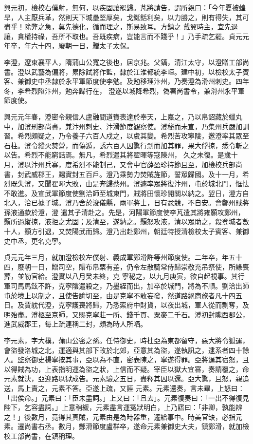 \begin{pinyinscope}
 興元初，檢校右僕射，無何，以疾固讓罷歸。芃將請告，謂所親曰：「今年夏被蝗旱，人主厭兵革，然則天下城壘堅厚矣，戈鋋銛利矣，以力勝之，則有得失，其可盡乎！除弊之急，莫先德化，循而理之，斯易致耳。方鎮之
 戴翼時主，宜先退讓，貪權持祿，吾所不取也。吾既疾病，豈能言而不踐乎！」乃手疏乞罷。貞元元年卒，年六十四，廢朝一日，贈太子太保。



 李澄，遼東襄平人，隋蒲山公寬之後也，居京兆。父鎬，清江太守，以澄贈工部尚書。澄以武藝為偏將，累除試將作監，隸於江淮都統李峘。建中初，以檢校太子賓客、兼御史中丞隸於永平軍節度使李勉。及勉移理汴州，乃奏澄為滑州刺史。四年冬，李希烈陷汴州，勉奔歸行在，
 澄遂以城降希烈，偽署尚書令，兼滑州永平軍節度使。



 興元元年春，澄密令親信人盧融間道賚表達於奉天，上嘉之，乃以帛詔藏於蠟丸中，加澄刑部尚書，兼汴州刺史、汴滑節度觀察使。澄秘而未宣，乃集州兵嚴加訓習。希烈頗疑之，乃令養子六百人戍之，以虞其變。希烈苦攻寧陵，邀澄率其眾至石柱。澄令縱火焚營，而偽遁，誘六百人因驚行剽而加其罪，果大俘掠，悉令斬之以告。希烈不能窮詰焉。無凡，希烈遣其將翟暉等寇陳州，
 久之未復。是歲十月，澄以汴州兵寡，度希烈不能制己，又會中官薛盈珍持節且至，加檢校兵部尚書，封武威郡王，賜實封五百戶。澄乃乘勢力焚賊旌節，誓眾歸國。及十一月，希烈既失澄，又聞翟暉大敗，由是奔歸蔡州。澄遽率眾將復汴州，屯於城北門，恇怯不敢進。及宣武軍節度使劉洽師至城東門，賊將田懷珍開關以納之。翌日，澄方自北入，洽已據子城。澄乃舍於浚儀縣，兩軍將士，日有忿競，不自安。會鄭州賊將孫液通款於澄，澄
 遣其子清赴之。先是，河陽軍節度使李芃遣其將雍顥攻鄭州，顥所過縱掠，液拒之尤固；及清至，遂納之。顥怒攻液，清以眾助之，殺登城者數十人，顥方引退，又焚陽武而歸。澄乃出赴鄭州，朝廷特授清檢校太子賓客、兼御史中丞，更名克寧。



 貞元元年三月，就加澄檢校左僕射、義成軍鄭滑許等州節度使。二年卒，年五十四，廢朝一日，贈司空，賵布帛粟有差，仍令左散騎常侍歸崇敬充吊祭使，所緣喪葬，並勒官給。澄實以八月癸未終，克
 寧秘之，以九月庚寅，欲自起視事。其行軍司馬馬鉉不許，克寧陰遣殺之，乃墨絰而出，加卒於城門，將為不順。劉洽出師屯於境上以制之，且使告諭切至，由是克寧不敢妄發，然道路絕商旅者凡十四五日。及賈躭代澄，克寧護喪將歸，乃悉索府中財貨，以夜出城，軍人從而剽奪，及明殆盡。澄柩至京師，又賜克寧莊一所、錢千貫、粟麥二千石。澄初封隴西郡公，進武威郡王，每上疏連稱二封，頗為時人所哂。



 李元素，字大樸，蒲山公密之孫。任侍御史，時杜亞為東都留守，惡大將令狐運，會盜發洛城之北，運適與其部下畋於北郊，亞意其為盜，遂執訊之，逮系者四十餘人。監察御史楊寧按其事，亞以為不直，密表陳之，寧遂得罪。亞將逞其宿怒，且以得賊為功，上表指明運為盜之狀，上信而不疑。宰臣以獄大宜審，奏請覆之，命元素就決，亞迎路以獄成告。元素驗之五日，盡釋其囚以還。亞大驚，且怒，親追送，馬上責之，元素不答。亞遂上疏，又誣
 元素。元素還奏，言未畢，上怒曰：「出俟命。」元素曰：「臣未盡詞。」上又曰：「且去」。元素復奏曰：「一出不得復見陛下，乞容盡詞。」上意稍緩，元素盡言運冤狀明白，上乃寤曰：「非卿，孰能辨之！」後數月，竟得其真賊，元素由是為時器重，遷給事中。時美官缺，必指元素。遷尚書右丞。數月，鄭滑節度盧群卒，遂命元素兼御史大夫，鎮鄭滑，就加檢校工部尚書，在鎮稱理。




\end{pinyinscope}
